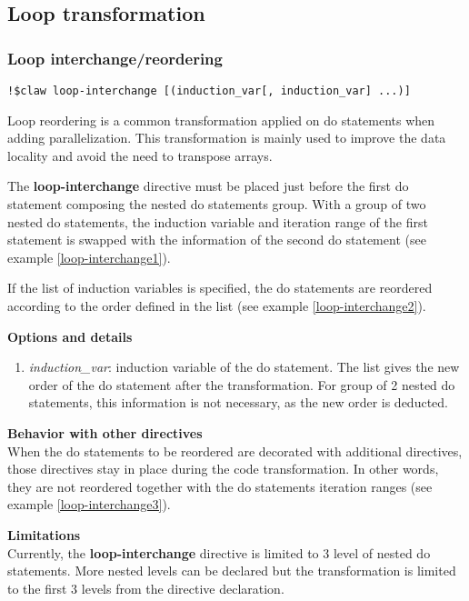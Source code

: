 \subsection{Loop transformation}
\subsubsection{Loop interchange/reordering}
\begin{lstlisting}
!$claw loop-interchange [(induction_var[, induction_var] ...)]
\end{lstlisting}

Loop reordering is a common transformation applied on do statements when adding
parallelization. This transformation is mainly used to improve the data locality
and avoid the need to transpose arrays.

The \textbf{loop-interchange} directive must be placed just before the first do
statement composing the nested do statements group. With a group of two nested
do statements, the induction variable and iteration range of the first statement
is swapped with the information of the second do statement (see example
\ref{loop-interchange1}).

If the list of induction variables is specified, the do statements are reordered
according to the order defined in the list (see example
\ref{loop-interchange2}).

\textbf{Options and details}
\begin{enumerate}
\item \textit{induction\_var}: induction variable of the do statement. The list
gives the new order of the do statement after the transformation. For group of
2 nested do statements, this information is not necessary, as the new order is
deducted.
\end{enumerate}

\textbf{Behavior with other directives}\\
When the do statements to be reordered are decorated with additional directives,
those directives stay in place during the code transformation. In other words,
they are not reordered together with the do statements iteration ranges
(see example \ref{loop-interchange3}).

\textbf{Limitations}\\
Currently, the \textbf{loop-interchange} directive is limited to 3 level of
nested do statements. More nested levels can be declared but the transformation
is limited to the first 3 levels from the directive declaration.

